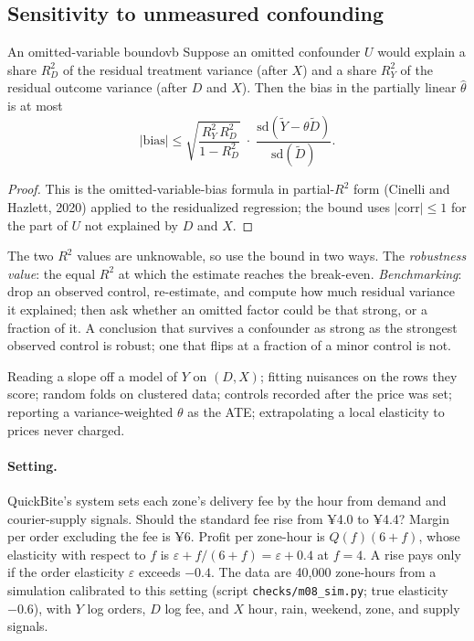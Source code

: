 \documentclass[11pt]{article}
\begin{document}
\subsection{Sensitivity to unmeasured confounding}

\begin{prop}{An omitted-variable bound}{ovb}
Suppose an omitted confounder $U$ would explain a share $R^2_{D}$ of the residual treatment variance (after $X$) and a share $R^2_{Y}$ of
the residual outcome variance (after $D$ and $X$). Then the bias in the partially linear $\hat\theta$ is at most
\[
  |\text{bias}| \le \sqrt{\frac{R^2_{Y}\,R^2_{D}}{1 - R^2_{D}}}\;\cdot\;\frac{\text{sd}(\tilde Y - \theta\tilde D)}{\text{sd}(\tilde D)} .
\]
\end{prop}
\begin{proof}
This is the omitted-variable-bias formula in partial-$R^2$ form (Cinelli and Hazlett, 2020) applied to the residualized regression; the
bound uses $|\text{corr}| \le 1$ for the part of $U$ not explained by $D$ and $X$.
\end{proof}

The two $R^2$ values are unknowable, so use the bound in two ways. The \emph{robustness value}: the equal $R^2$ at which the estimate
reaches the break-even. \emph{Benchmarking}: drop an observed control, re-estimate, and compute how much residual variance it explained;
then ask whether an omitted factor could be that strong, or a fraction of it. A conclusion that survives a confounder as strong as the
strongest observed control is robust; one that flips at a fraction of a minor control is not.

\begin{pitfall}
Reading a slope off a model of $Y$ on $(D, X)$; fitting nuisances on the rows they score; random folds on clustered data; controls
recorded after the price was set; reporting a variance-weighted $\theta$ as the ATE; extrapolating a local elasticity to prices never
charged.
\end{pitfall}

\sectiontwo

\paragraph{Setting.} QuickBite's system sets each zone's delivery fee by the hour from demand and courier-supply signals. Should the
standard fee rise from ¥4.0 to ¥4.4? Margin per order excluding the fee is ¥6. Profit per zone-hour is $Q(f)(6 + f)$, whose elasticity
with respect to $f$ is $\varepsilon + f/(6 + f) = \varepsilon + 0.4$ at $f = 4$. A rise pays only if the order elasticity $\varepsilon$ exceeds $-0.4$.
The data are 40{,}000 zone-hours from a simulation calibrated to this setting (script \texttt{checks/m08\_sim.py}; true elasticity
$-0.6$), with $Y$ log orders, $D$ log fee, and $X$ hour, rain, weekend, zone, and supply signals.
\end{document}

